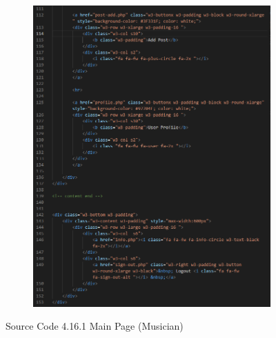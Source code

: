 \begin{enumerate}[1.]
\begin{figure}[h]
\begin{subfigure}[b]{0.6\textwidth}
            \includegraphics[width=\textwidth]{mainmatter/images/frontend/code/musicmain2.png}
            \label{fig:sub2}
        \end{subfigure}
        \caption*{Source Code 4.16.1 Main Page (Musician)}
        \label{fig:myfig55a}
    \end{figure}
    \clearpage


\end{enumerate}
